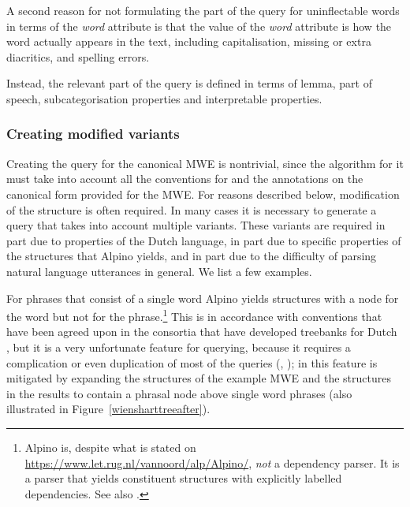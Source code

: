 \documentclass[output=paper,colorlinks,citecolor=brown]{langscibook}
\begin{document}
A second reason for not formulating the part of the query for uninflectable words in terms of the \textit{word} attribute is that the value of the \textit{word} attribute is how the word actually appears in the text, including capitalisation, missing or extra diacritics, and spelling errors.

Instead, the relevant part of the query is defined in terms of lemma, part of speech, subcategorisation properties and interpretable properties.

\subsubsection{Creating modified variants}
\label{variants}

Creating the query for the canonical MWE is nontrivial, since the algorithm for it must take into account all the conventions for and the annotations on the canonical form provided for the MWE. For reasons described below, modification of the structure is often required. In many cases it is necessary to generate a query that takes into account multiple variants. These variants are required in part due to properties of the Dutch language, in part due to specific properties of the structures that Alpino yields, and in part due to the difficulty of parsing natural language utterances in general. We list a few examples.

 For phrases that consist of a single word Alpino yields structures with a node for the word but not for the phrase.\footnote{Alpino is, despite what is stated on \url{https://www.let.rug.nl/vannoord/alp/Alpino/}, \textit{not} a dependency parser. It is a parser that yields constituent structures with explicitly labelled dependencies. See also \citet[283--285]{Odijk:etal:PaQu}.} This is in accordance with conventions that have been agreed upon in the consortia that have developed treebanks for Dutch \citep{Hoekstra:etal:2003,LASSY:SA-MAN}, but it is a very unfortunate feature for querying, because it requires a complication or even duplication of most of the queries  (\cite[106--107]{VANEYNDE2016104}, \cite{Odijk:etal:PaQu,Odijk:LiberAmicorum:2022}); in {\mwefinder} this feature is mitigated by expanding the structures of the example MWE and the structures in the {\supersetquery} results to contain a phrasal node above single word phrases (also illustrated in Figure~\ref{wiensharttreeafter}).
\end{document}
